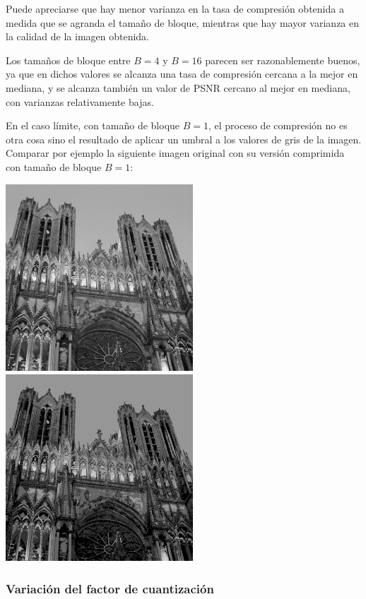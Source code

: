 \documentclass{article}
\begin{document}
Puede apreciarse que hay menor varianza en la tasa de compresión
obtenida a medida que se agranda el tamaño de bloque,
mientras que hay mayor varianza en la calidad de la imagen obtenida.

Los tamaños de bloque entre $B = 4$ y $B = 16$ parecen ser razonablemente
buenos,
ya que en dichos valores se alcanza una tasa de compresión cercana a la
mejor en mediana,
y se alcanza también un valor de PSNR cercano al mejor en mediana,
con varianzas relativamente bajas.

\bigskip
En el caso límite, con tamaño de bloque $B = 1$, el proceso de
compresión no es otra cosa sino el resultado de aplicar un umbral
a los valores de gris de la imagen.
Comparar por ejemplo la siguiente imagen original con su versión
comprimida con tamaño de bloque $B = 1$:
\begin{center}
\includegraphics[width=7cm]{../imgs/input/imgs_gray/img04.png}
\includegraphics[width=7cm]{../imgs/output/gray_1_50_2000/img04.png}
\end{center}

\subsubsection{Variación del factor de cuantización}
\label{sec:variacion_factor_cuantizacion}
\end{document}
